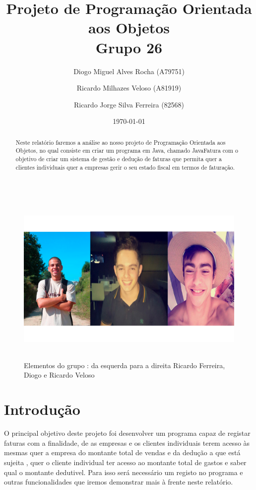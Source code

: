 \documentclass[a4paper]{article}
\title{Projeto de Programação Orientada aos Objetos\\Grupo 26 }
\author{Diogo Miguel Alves Rocha (A79751)\and Ricardo Milhazes Veloso (A81919) \and Ricardo Jorge Silva Ferreira (82568)}
\date{\today}
\begin{document}
\maketitle

\begin{figure}[H]
	\centering
	\includegraphics[width = 420pt,height = 240pt]{nos.png}
	\caption{Elementos do grupo : da esquerda para a direita Ricardo Ferreira, Diogo e Ricardo Veloso}
\end{figure}
\begin{abstract}
 
 Neste relatório faremos a análise ao nosso projeto de Programação Orientada aos Objetos, no qual consiste em criar um programa em Java, chamado JavaFatura com o objetivo de criar um sistema de gestão e dedução de faturas que permita quer a clientes individuais quer a empresas gerir o seu estado fiscal em termos de faturação.

 \end{abstract}

\pagebreak

\tableofcontents

\pagebreak

\section{Introdução}
\label{sec:intro} 

O principal objetivo deste projeto foi desenvolver um programa capaz de registar faturas com a finalidade, de as empresas e os clientes individuais terem acesso às mesmas quer a empresa do montante total de vendas e da dedução a que está sujeita , quer o cliente individual ter acesso ao montante total de gastos e saber qual o montante dedutivel. Para isso será necessário um registo no programa e outras funcionalidades que iremos demonstrar mais à frente neste relatório.
\end{document}
